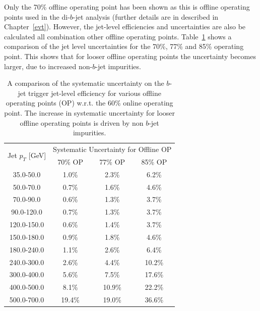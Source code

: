 Only the 70\% offline operating point has been shown as this is offline operating points used in the di-$b$-jet analysis (further details are in described in Chapter~\ref{evt}).
However, the jet-level efficiencies and uncertainties are also be calculated all combination other offline operating points.
Table~\ref{tab:trig-bTrig_jetSys_opComp} shows a comparison of the jet level uncertainties for the 70\%, 77\% and 85\% operating point.
This shows that for looser offline operating points the uncertainty becomes larger, due to increased non-$b$-jet impurities.


\begin{table}[ht]
  \begin{center}
  \begin{tabular}{|c||c|c|c|}
    \hline
    \multirow{2}{*}{Jet $p_T$ [GeV]} &\multicolumn{3}{c|}{Systematic Uncertainty for Offline OP} \\ \cline{2-4} 

                & \hspace{1.5mm}70\% OP\hspace{1.5mm} & \hspace{1.5mm}77\% OP\hspace{1.5mm} & \hspace{1.5mm}85\% OP\hspace{1.5mm} \\
    \hline
    35.0-50.0   & 1.0\%   & 2.3\%   & 6.2\%  \\
    50.0-70.0   & 0.7\%   & 1.6\%   & 4.6\%  \\
    70.0-90.0   & 0.6\%   & 1.3\%   & 3.7\%  \\
    90.0-120.0  & 0.7\%   & 1.3\%   & 3.7\%  \\
    120.0-150.0 & 0.6\%   & 1.4\%   & 3.7\%  \\
    150.0-180.0 & 0.9\%   & 1.8\%   & 4.6\%  \\
    180.0-240.0 & 1.1\%   & 2.6\%   & 6.4\%  \\
    \hline          
    240.0-300.0 & 2.6\%   & 4.4\%   & 10.2\% \\
    300.0-400.0 & 5.6\%   & 7.5\%   & 17.6\% \\
    400.0-500.0 & 8.1\%   & 10.9\%  & 22.2\% \\
    500.0-700.0 & 19.4\%  & 19.0\%  & 36.6\% \\
    \hline
  \end{tabular}
  \vspace{10pt}
  \end{center}
  \caption{
    A comparison of the systematic uncertainty on the $b$-jet trigger jet-level efficiency 
    for various offline operating points (OP) w.r.t. the 60\% online operating point.
    The increase in systematic uncertainty for looser offline operating points is driven by non $b$-jet impurities.
  }
  \label{tab:trig-bTrig_jetSys_opComp}
  \end{table}

